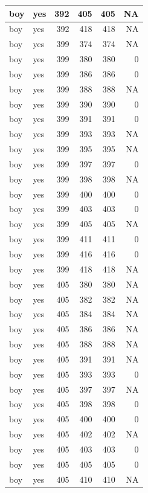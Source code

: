 \documentclass[man]{apa6}
\begin{document}
\begin{tabular}{l|l|r|r|r|r}
\hline
boy & yes & 392 & 405 & 405 & NA\\
\hline
boy & yes & 392 & 418 & 418 & NA\\
\hline
boy & yes & 399 & 374 & 374 & NA\\
\hline
boy & yes & 399 & 380 & 380 & 0\\
\hline
boy & yes & 399 & 386 & 386 & 0\\
\hline
boy & yes & 399 & 388 & 388 & NA\\
\hline
boy & yes & 399 & 390 & 390 & 0\\
\hline
boy & yes & 399 & 391 & 391 & 0\\
\hline
boy & yes & 399 & 393 & 393 & NA\\
\hline
boy & yes & 399 & 395 & 395 & NA\\
\hline
boy & yes & 399 & 397 & 397 & 0\\
\hline
boy & yes & 399 & 398 & 398 & NA\\
\hline
boy & yes & 399 & 400 & 400 & 0\\
\hline
boy & yes & 399 & 403 & 403 & 0\\
\hline
boy & yes & 399 & 405 & 405 & NA\\
\hline
boy & yes & 399 & 411 & 411 & 0\\
\hline
boy & yes & 399 & 416 & 416 & 0\\
\hline
boy & yes & 399 & 418 & 418 & NA\\
\hline
boy & yes & 405 & 380 & 380 & NA\\
\hline
boy & yes & 405 & 382 & 382 & NA\\
\hline
boy & yes & 405 & 384 & 384 & NA\\
\hline
boy & yes & 405 & 386 & 386 & NA\\
\hline
boy & yes & 405 & 388 & 388 & NA\\
\hline
boy & yes & 405 & 391 & 391 & NA\\
\hline
boy & yes & 405 & 393 & 393 & 0\\
\hline
boy & yes & 405 & 397 & 397 & NA\\
\hline
boy & yes & 405 & 398 & 398 & 0\\
\hline
boy & yes & 405 & 400 & 400 & 0\\
\hline
boy & yes & 405 & 402 & 402 & NA\\
\hline
boy & yes & 405 & 403 & 403 & 0\\
\hline
boy & yes & 405 & 405 & 405 & 0\\
\hline
boy & yes & 405 & 410 & 410 & NA\\

\end{tabular}
\end{document}
